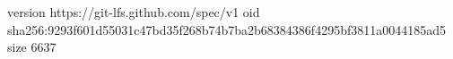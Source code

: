 version https://git-lfs.github.com/spec/v1
oid sha256:9293f601d55031c47bd35f268b74b7ba2b68384386f4295bf3811a0044185ad5
size 6637

